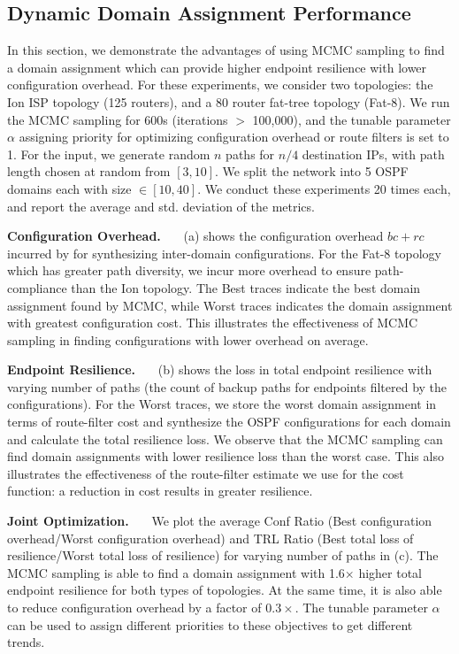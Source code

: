 \subsection{Dynamic Domain Assignment Performance} \label{sec:mcmceval}
In this section, we demonstrate the advantages of using MCMC sampling
to find a domain assignment which can provide higher endpoint
resilience with lower configuration overhead. For these experiments,
we consider two topologies: the Ion ISP topology (125 routers), and a
80 router fat-tree topology (Fat-8). We run the MCMC sampling for 600s
(iterations $>$ 100,000), and the tunable parameter $\alpha$ assigning
priority for optimizing configuration overhead or route filters is set
to 1. For the input, we generate random $n$ paths for $n/4$
destination IPs, with path length chosen at random from $[3,10]$. We
split the network into 5 OSPF domains each with size $\in [10,40]$. We
conduct these experiments 20 times each, and report the average and
std. deviation of the metrics.

\noindent\textbf{Configuration Overhead.}~~~
(a) shows the configuration overhead $bc + rc$ 
incurred by \name for synthesizing inter-domain configurations.
For the Fat-8 topology which has greater path diversity, we incur more 
overhead to ensure path-compliance than the Ion topology. 
The Best traces indicate the best domain assignment found by MCMC, while 
Worst traces indicates the domain assignment with greatest 
configuration cost. 
This illustrates
the effectiveness of MCMC sampling in finding configurations with lower overhead on average.

\noindent\textbf{Endpoint Resilience.}~~~ (b) shows
the loss in total endpoint resilience with varying number of paths
(the count of backup paths for endpoints filtered by the
configurations). For the Worst traces, we store the worst domain
assignment in terms of route-filter cost and synthesize the OSPF
configurations for each domain and calculate the total resilience
loss. We observe that the MCMC sampling can find domain assignments
with lower resilience loss than the worst case. This also illustrates
the effectiveness of the route-filter estimate we use for the cost
function: a reduction in cost results in greater resilience.

\noindent\textbf{Joint Optimization.}~~~
We plot the average Conf Ratio 
(Best configuration overhead/Worst configuration overhead) and TRL
Ratio (Best total loss of resilience/Worst total loss of resilience)
for varying number of paths in (c). The MCMC
sampling is able to find a domain assignment
with 1.6$\times$ higher total endpoint resilience for both types
of topologies. At the same time, it is also able to reduce configuration
overhead by a factor of $0.3\times$. The tunable parameter $\alpha$ 
can be used to assign different priorities to these objectives to get
different trends. 

